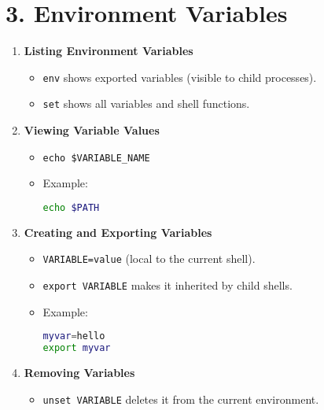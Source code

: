 \documentclass[a4paper]{report}
\begin{document}
\section*{3. Environment Variables}
\begin{enumerate}
    \item \textbf{Listing Environment Variables}
    \begin{itemize}
        \item \texttt{env} shows exported variables (visible to child processes).
        \item \texttt{set} shows all variables and shell functions.
    \end{itemize}

    \item \textbf{Viewing Variable Values}
    \begin{itemize}
        \item \texttt{echo \$VARIABLE\_NAME}
        \item Example:
        \begin{lstlisting}[language=bash]
echo $PATH
        \end{lstlisting}
    \end{itemize}

    \item \textbf{Creating and Exporting Variables}
    \begin{itemize}
        \item \texttt{VARIABLE=value} (local to the current shell).
        \item \texttt{export VARIABLE} makes it inherited by child shells.
        \item Example:
        \begin{lstlisting}[language=bash]
myvar=hello
export myvar
        \end{lstlisting}
    \end{itemize}

    \item \textbf{Removing Variables}
    \begin{itemize}
        \item \texttt{unset VARIABLE} deletes it from the current environment.
    \end{itemize}
\end{enumerate}
\end{document}
